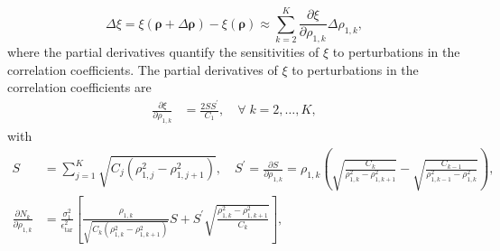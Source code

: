 %
\[
\Delta\xi=\xi(\boldsymbol{\rho}+\Delta \boldsymbol{\rho}) - \xi(\boldsymbol{\rho}) \approx \sum_{k=2}^K \frac{\partial \xi}{\partial \rho_{1,k}} \Delta\rho_{1,k},
\]
%
where the partial derivatives quantify the sensitivities of $\xi$  to perturbations in the correlation coefficients. The partial derivatives of $\xi$ to perturbations in the correlation coefficients are
%
\begin{align}
\label{eq:partial_xi_rho}
\frac{\partial  \xi}{\partial  \rho_{1,k}} 
&=\frac{2SS^\prime}{C_1}, \quad \forall\; k=2,\ldots, K,
\end{align}
%
with
%
\begin{align}
\label{eq:S_n_S_prime}
S& = \sum_{j=1}^K\sqrt{C_j\left(\rho_{1,j}^2-\rho_{1,j+1}^2\right)},\quad
S^\prime = \frac{\partial  S}{\partial  \rho_{1,k}} = \rho_{1,k}\left(\sqrt{\frac{C_k}{\rho_{1,k}^2-\rho_{1,k+1}^2}} - \sqrt{\frac{C_{k-1}}{\rho_{1,k-1}^2-\rho_{1,k}^2}}\right),\\
\nonumber
\frac{\partial N_{k}}{\partial  \rho_{1,k}}&=\frac{\sigma_1^2}{\epsilon_{\text{tar}}^2}\left[\frac{\rho_{1,k}}{\sqrt{C_{k}\left(\rho_{1,k}^2 - \rho_{1,k+1}^2\right)}}S+S^\prime \sqrt{\frac{\rho_{1,k}^2 - \rho_{1,k+1}^2}{C_{k}}}\right],\\
\end{align}
%



